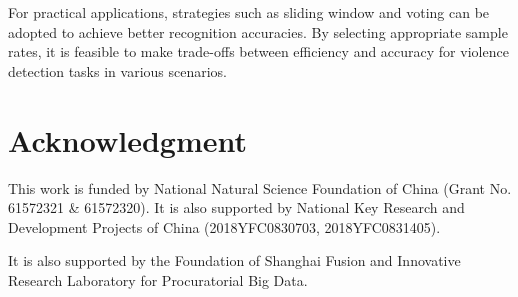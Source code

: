 \documentclass[10pt,twocolumn,letterpaper]{article}
\begin{document}
For practical applications, strategies such as sliding window and voting can be adopted to achieve better recognition accuracies. 
By selecting appropriate sample rates, it is feasible to make trade-offs between efficiency and accuracy for violence detection tasks in various scenarios.


\section{Acknowledgment}
\label{sec:6}

This work is funded by National Natural Science Foundation of China (Grant No. 61572321 \& 61572320).
It is also supported by National Key Research and Development Projects of China (2018YFC0830703, 2018YFC0831405).

It is also supported by the Foundation of Shanghai Fusion and Innovative Research Laboratory for Procuratorial Big Data.

\end{document}
